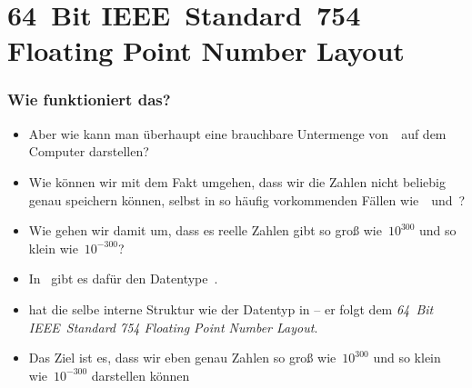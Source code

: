 \documentclass[aspectratio=169,mathserif,notheorems]{beamer}%
\begin{document}
\section{64~Bit IEEE~Standard~754 Floating Point Number Layout}%
%
\begin{frame}%
\frametitle{Wie funktioniert das?}%
\begin{itemize}%
\item Aber wie kann man überhaupt eine brauchbare Untermenge von~\realNumbers\ auf dem Computer darstellen?%
\item<2-> Wie können wir mit dem Fakt umgehen, dass wir die Zahlen nicht beliebig genau speichern können, selbst in so häufig vorkommenden Fällen wie~\numberPi\ und~\numberE?%
\item<3-> Wie gehen wir damit um, dass es reelle Zahlen gibt so groß wie~$10^{300}$ und so klein wie~$10^{-300}$?%
\item<4-> In \python\ gibt es dafür den Datentype~.%
\item<5->  hat die selbe interne Struktur wie der Datentyp  in \cite{PSF:P3D:TPSL:NTIFC} -- er folgt dem \emph{64~Bit IEEE~Standard 754 Floating Point Number Layout}\cite{IEEE2019ISFFPA,H1997IS7FPN,G1991WECSSKAFPA}.%
\item<6-> Das Ziel ist es, dass wir eben genau Zahlen so groß wie~$10^{300}$ und so klein wie~$10^{-300}$ darstellen können%
\end{itemize}%
\end{frame}%
\end{document}

